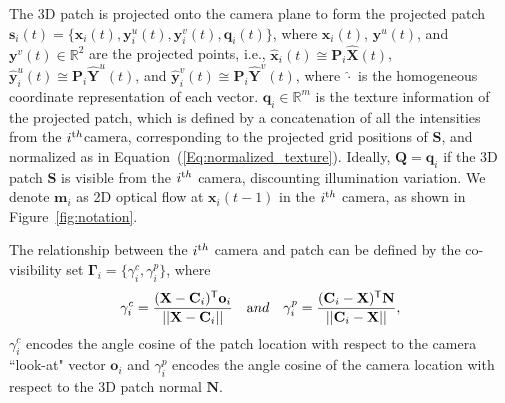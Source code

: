 The 3D patch is projected onto the camera plane to form the projected patch $\mathbf{s}_i(t) = \{\mathbf{x}_i(t), \mathbf{y}_i^u(t), \mathbf{y}_i^v(t), \mathbf{q}_i(t) \}$, where $\mathbf{x}_i(t)$, $\mathbf{y}^u(t)$, and $\mathbf{y}^v(t) \in \mathds{R}^2$ are the projected points, i.e., $\widehat{\mathbf{x}}_i(t) \cong \mathbf{P}_i \widehat{\mathbf{X}}(t)$, $\widehat{\mathbf{y}}_i^u(t) \cong \mathbf{P}_i \widehat{\mathbf{Y}}^u(t)$, and $\widehat{\mathbf{y}}_i^v(t) \cong \mathbf{P}_i \widehat{\mathbf{Y}}^v(t)$, where $\widehat{\cdot}$ is the homogeneous coordinate representation of each vector. $\mathbf{q}_i  \in \mathds{R}^m$ is the texture information of the projected patch, which is defined by a concatenation of all the intensities from the $i^{\textrm th}$camera, corresponding to the projected grid positions of $\mathbf{S}$, and normalized as in Equation~(\ref{Eq:normalized_texture}). Ideally, $\mathbf{Q}=\mathbf{q}_i$ if the 3D patch $\mathbf{S}$ is visible from the $i^{\textrm th}$ camera, discounting illumination variation. We denote $\mathbf{m}_i$ as 2D optical flow at $\mathbf{x}_i(t-1)$ in the $i^{\textrm th}$ camera, as shown in Figure~\ref{fig:notation}. 

The relationship between the $i^{\textrm th}$ camera and patch can be defined by the co-visibility set $\bm{\Gamma}_i = \{\gamma^c_i, \gamma^p_i\}$, where
\begin{eqnarray}
\gamma^c_i = \frac{ (\mathbf{X}-\mathbf{C}_i)^\mathsf{T}\mathbf{o}_i} { || \mathbf{X}-\mathbf{C}_i || }~~~{\textrm and}~~~\gamma^p_i = \frac{ (\mathbf{C}_i - \mathbf{X})^\mathsf{T}\mathbf{N}} { || \mathbf{C}_i - \mathbf{X} || }, \nonumber
\end{eqnarray}
$\gamma^c_i$ encodes the angle cosine of the patch location with respect to the camera ``look-at" vector $\mathbf{o}_i$ and $\gamma^p_i$ encodes the angle cosine of the camera location with respect to the 3D patch normal $\mathbf{N}$.




